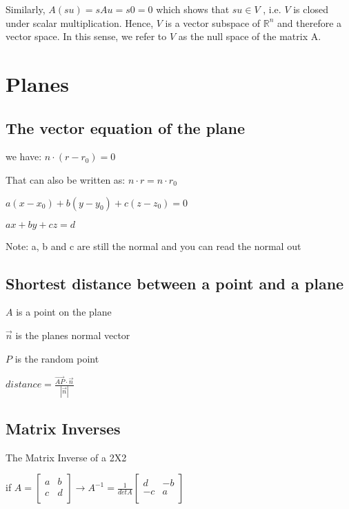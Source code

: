 \documentclass{extarticle}
\begin{document}
\begin{multicols}{4}
\begin{tcolorbox}[enhanced jigsaw,sharp corners,coltext=black,colback=BurntOrange!25!white,boxrule=0pt,breakable,size=minimal]
Similarly, $A(su) = sAu = s0 = 0$ which shows that $su \in V$ , i.e. $V$ is closed under scalar multiplication.
Hence, $V$ is a vector subspace of ${\mathbb{R}}^n$ and therefore a vector space. In this sense, we refer to $V$ as the null space of the matrix A.
\end{tcolorbox}


\section{Planes}
\subsection{The vector equation of the plane}
we have: $n\cdot\left(r-r_0\right)=0$

That can also be written as: $n\cdot r=n\cdot r_0$

$a\left(x-x_0\right)+b\left(y-y_0\right)+c\left(z-z_0\right)=0$

$ax+by+cz=d$

Note: a, b and c are still the normal and you can read the normal out


\begin{tcolorbox}[enhanced jigsaw,sharp corners,coltext=black,colback=Red!25!white,boxrule=0pt,breakable,size=minimal]
\subsection{Shortest distance between a point and a plane}
$A$ is a point on the plane

$\vec{n}$ is the planes normal vector

$P$ is the random point

$distance=\frac{\vec{AP}\cdot\vec{n}}{\left|\vec{n}\right|}$



\end{tcolorbox}







\subsection{Matrix Inverses}
The Matrix Inverse of a 2X2

if $A=\left[\begin{matrix}a&b\\c&d\\\end{matrix}\right]\rightarrow A^{-1}=\frac{1}{detA}\left[\begin{matrix}d&-b\\-c&a\\\end{matrix}\right]$


\end{multicols}
\end{document}
